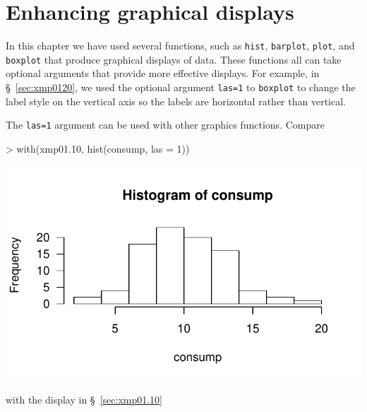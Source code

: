 \documentclass{book}
\begin{document}
\section{Enhancing graphical displays}
\label{sec:ch1enhance}

In this chapter we have used several functions, such as \texttt{hist},
\texttt{barplot}, \texttt{plot}, and \texttt{boxplot} that produce
graphical displays of data.  These functions all can take optional
arguments that provide more effective displays.  For example, in
\S~\ref{sec:xmp0120}, we used the optional argument \texttt{las=1} to
\texttt{boxplot} to change the label style on the vertical axis so the
labels are horizontal rather than vertical.

The \texttt{las=1} argument can be used with other graphics functions.
Compare
\begin{center}
\begin{Schunk}
\begin{Sinput}
> with(xmp01.10, hist(consump, las = 1))
\end{Sinput}
\end{Schunk}
\includegraphics{Devore6-030}
\end{center}
with the display in \S~\ref{sec:xmp01.10}
\end{document}
